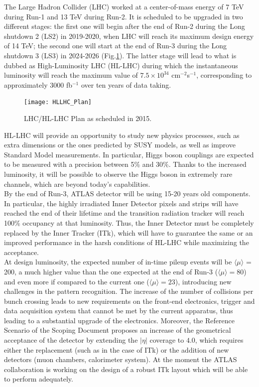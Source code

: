 \documentclass[a4paper,twoside,12pt]{book}
\begin{document}
The Large Hadron Collider (LHC) worked at a center-of-mass energy of 7 TeV during Run-1 and 13 TeV during Run-2. It is scheduled to be upgraded in two different stages: the first one will begin after the end of Run-2 during the Long shutdown 2 (LS2) in 2019-2020, when LHC will reach its maximum design energy of 14 TeV; the second one will start at the end of Run-3 during the Long shutdown 3 (LS3) in 2024-2026 (Fig.\ref{fig:HLLHC_Plan}). The latter stage will lead to what is dubbed as High-Luminosity LHC (HL-LHC) during which the
instantaneous luminosity will reach the maximum value of $7.5 \times 10^{34}$ cm$^{-2}$s$^{-1}$, corresponding to approximately 3000 fb$^{-1}$ over ten years of data taking. \\

\begin{figure} [h]
	\texttt{[image: HLLHC\_Plan]}
	\caption{LHC/HL-LHC Plan as scheduled in 2015\cite{scoping}.}
	\label{fig:HLLHC_Plan}
\end{figure}

HL-LHC will provide an opportunity to study new physics processes, such as extra dimensions or the ones predicted by SUSY models, as well as improve Standard Model measurements. In particular, Higgs boson 
couplings are expected to be measured with a precision between 5\% and 30\%\cite{loi}. Thanks to the increased luminosity, it will be possible to observe the Higgs boson in extremely
rare channels, which are beyond today's capabilities.\\

By the end of Run-3, ATLAS detector will be using 15-20 years old components. In particular,
the highly irradiated Inner Detector pixels and strips will have reached the end of their
lifetime and the transition radiation tracker will reach 100\% occupancy at that luminosity. Thus, the Inner Detector must be completely replaced by the Inner Tracker (ITk), which will
have to guarantee the same or an improved performance in the harsh conditions of HL-LHC while maximizing the acceptance. \\

At design luminosity, the expected number of in-time pileup events will be $\langle\mu\rangle$ = 200, a much
higher value than the one expected at the end of Run-3 ($\langle\mu\rangle = 80$) and even more if 
compared to the current one ($\langle\mu\rangle = 23$), introducing new challenges in the pattern
recognition. The increase of the number
of collisions per bunch crossing leads to new requirements on the front-end electronics, trigger and data acquisition system that cannot be met by the current apparatus, thus leading to a 
substantial upgrade of the electronics. Moreover, the Reference Scenario of the Scoping Document\cite{scoping} proposes an increase of the geometrical acceptance of the detector by extending the $|\eta|$ coverage to $4.0$, which requires either the replacement (such as in the case of ITk) or the addition of new detectors (muon chambers,
calorimeter system). 
At the moment the ATLAS collaboration is working on the design of a robust ITk layout which will be able to perform adequately.\\
\end{document}
